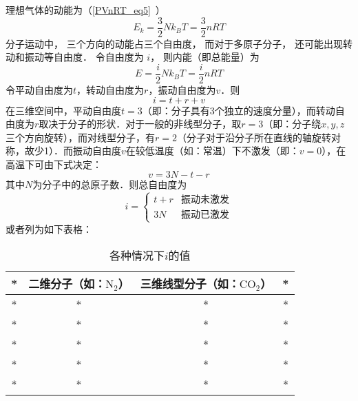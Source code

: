
\begin{issues}
\issueDraft
\end{issues}


理想气体的动能为（\autoref{PVnRT_eq5}~）
\begin{equation}
E_k = \frac32 Nk_B T = \frac{3}{2}nRT
\end{equation}
分子运动中， 三个方向的动能占三个自由度， 而对于多原子分子， 还可能出现转动和振动等自由度． 令自由度为 $i$， 则内能（即总能量）为
\begin{equation}\label{IdgEng_eq1}
E = \frac{i}{2}Nk_B T = \frac{i}{2}nRT
\end{equation}
令平动自由度为$t$，转动自由度为$r$，振动自由度为$v$．则
\begin{equation}
i=t+r+v
\end{equation}
在三维空间中，平动自由度$t=3$（即：分子具有3个独立的速度分量），而转动自由度为$r$取决于分子的形状．对于一般的非线型分子，取$r=3$（即：分子绕$x,y,z$三个方向旋转），而对线型分子，有$r=2$（分子对于沿分子所在直线的轴旋转对称，故少1）．而振动自由度$v$在较低温度（如：常温）下不激发（即：$v=0$），在高温下可由下式决定：
\begin{equation}
v=3N-t-r
\end{equation}
其中$N$为分子中的总原子数．则总自由度为
\begin{equation}
i=\left\{\begin{matrix}{t+r}&{\text{振动未激发}}\\{3N}&{振动已激发}\end{matrix}\right.
\end{equation}
或者列为如下表格：\begin{table}[ht]
\centering
\caption{各种情况下$i$的值}\label{IdgEng_tab1}
\begin{tabular}{|c|c|c|c|}
\hline
* & 二维分子（如：$\text{N}_2$） & 三维线型分子（如：$\text{CO}_2$） & * \\
\hline
* & * & * & * \\
\hline
* & * & * & * \\
\hline
* & * & * & * \\
\hline
* & * & * & * \\
\hline
* & * & * & * \\
\hline
\end{tabular}
\end{table}
